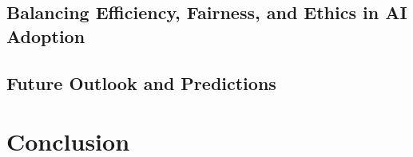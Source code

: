 \documentclass[
]{book}
\begin{document}
\hypertarget{balancing-efficiency-fairness-and-ethics-in-ai-adoption}{%
\section{Balancing Efficiency, Fairness, and Ethics in AI Adoption}\label{balancing-efficiency-fairness-and-ethics-in-ai-adoption}}

\hypertarget{future-outlook-and-predictions}{%
\section{Future Outlook and Predictions}\label{future-outlook-and-predictions}}

\hypertarget{conclusion}{%
\chapter{Conclusion}\label{conclusion}}

  
\end{document}

